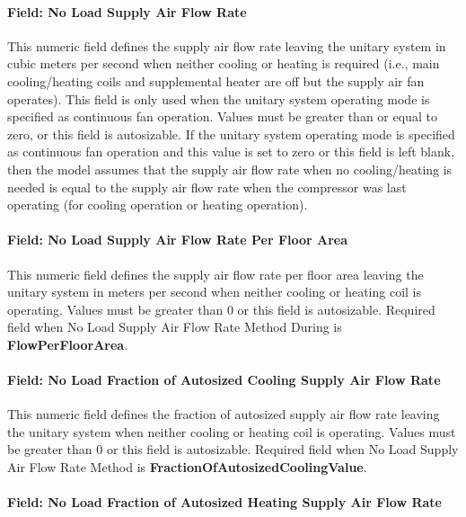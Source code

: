 \paragraph{Field: No Load Supply Air Flow Rate}\label{field-no-load-supply-air-flow-rate-000}

This numeric field defines the supply air flow rate leaving the unitary system in cubic meters per second when neither cooling or heating is required (i.e., main cooling/heating coils and supplemental heater are off but the supply air fan operates). This field is only used when the unitary system operating mode is specified as continuous fan operation. Values must be greater than or equal to zero, or this field is autosizable. If the unitary system operating mode is specified as continuous fan operation and this value is set to zero or this field is left blank, then the model assumes that the supply air flow rate when no cooling/heating is needed is equal to the supply air flow rate when the compressor was last operating (for cooling operation or heating operation).

\paragraph{Field: No Load Supply Air Flow Rate Per Floor Area}\label{field-no-load-supply-air-flow-rate-per-floor-area}

This numeric field defines the supply air flow rate per floor area leaving the unitary system in meters per second when neither cooling or heating coil is operating. Values must be greater than 0 or this field is autosizable. Required field when No Load Supply Air Flow Rate Method During is \textbf{FlowPerFloorArea}.

\paragraph{Field: No Load Fraction of Autosized Cooling Supply Air Flow Rate}\label{field-no-load-fraction-of-autosized-cooling-supply-air-flow-rate}

This numeric field defines the fraction of autosized supply air flow rate leaving the unitary system when neither cooling or heating coil is operating. Values must be greater than 0 or this field is autosizable. Required field when No Load Supply Air Flow Rate Method is \textbf{FractionOfAutosizedCoolingValue}.

\paragraph{Field: No Load Fraction of Autosized Heating Supply Air Flow Rate}\label{field-no-load-fraction-of-autosized-heating-supply-air-flow-rate}

